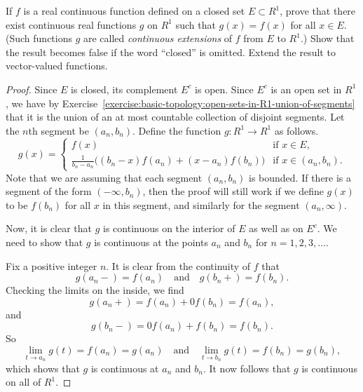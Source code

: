  If $f$ is a real continuous function defined on a closed
set $E\subset R^1$, prove that there exist continuous real functions
$g$ on $R^1$ such that $g(x) = f(x)$ for all $x\in E$. (Such functions
$g$ are called {\em continuous extensions} of $f$ from $E$ to $R^1$.)
Show that the result becomes false if the word ``closed'' is
omitted. Extend the result to vector-valued functions.
\begin{proof}
  Since $E$ is closed, its complement $E^c$ is open. Since $E^c$ is an
  open set in $R^1$, we have by
  Exercise~\ref{exercise:basic-topology:open-sets-in-R1-union-of-segments}
  that it is the union of an at most countable collection of disjoint
  segments. Let the $n$th segment be $(a_n,b_n)$. Define the function
  $g\colon R^1\to R^1$ as follows.
  \begin{equation*}
    g(x) =
    \begin{cases}
      f(x) & \text{if $x\in E$}, \\
      \frac1{b_n - a_n}\big((b_n - x)f(a_n)
      + (x - a_n)f(b_n)\big) & \text{if $x\in(a_n,b_n)$}.
    \end{cases}
  \end{equation*}
  Note that we are assuming that each segment $(a_n,b_n)$ is
  bounded. If there is a segment of the form $(-\infty,b_n)$, then the
  proof will still work if we define $g(x)$ to be $f(b_n)$ for all $x$
  in this segment, and similarly for the segment $(a_n,\infty)$.

  Now, it is clear that $g$ is continuous on the interior of $E$ as
  well as on $E^c$. We need to show that $g$ is continuous at the
  points $a_n$ and $b_n$ for $n = 1,2,3,\dots$.

  Fix a positive integer $n$. It is clear from the continuity of $f$
  that
  \begin{equation*}
    g(a_n-) = f(a_n)
    \quad\text{and}\quad
    g(b_n+) = f(b_n).
  \end{equation*}
  Checking the limits on the inside, we find
  \begin{equation*}
    g(a_n+) = f(a_n) + 0f(b_n) = f(a_n),
  \end{equation*}
  and
  \begin{equation*}
    g(b_n-) = 0f(a_n) + f(b_n) = f(b_n).
  \end{equation*}
  So
  \begin{equation*}
    \lim_{t\to a_n}g(t) = f(a_n) = g(a_n)
    \quad\text{and}\quad
    \lim_{t\to b_n}g(t) = f(b_n) = g(b_n),
  \end{equation*}
  which shows that $g$ is continuous at $a_n$ and $b_n$. It now
  follows that $g$ is continuous on all of $R^1$.


\end{proof}
